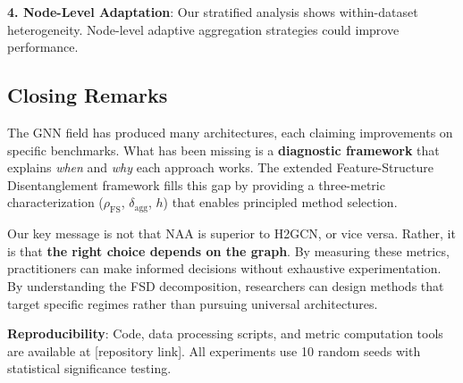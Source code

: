 \textbf{4. Node-Level Adaptation}: Our stratified analysis shows within-dataset heterogeneity. Node-level adaptive aggregation strategies could improve performance.

\subsection{Closing Remarks}

The GNN field has produced many architectures, each claiming improvements on specific benchmarks. What has been missing is a \textbf{diagnostic framework} that explains \textit{when} and \textit{why} each approach works. The extended Feature-Structure Disentanglement framework fills this gap by providing a three-metric characterization ($\rho_{\text{FS}}$, $\delta_{\text{agg}}$, $h$) that enables principled method selection.

Our key message is not that NAA is superior to H2GCN, or vice versa. Rather, it is that \textbf{the right choice depends on the graph}. By measuring these metrics, practitioners can make informed decisions without exhaustive experimentation. By understanding the FSD decomposition, researchers can design methods that target specific regimes rather than pursuing universal architectures.

\textbf{Reproducibility}: Code, data processing scripts, and metric computation tools are available at [repository link]. All experiments use 10 random seeds with statistical significance testing.
